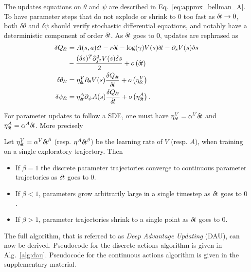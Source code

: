 The updates equations on $\theta$ and $\psi$ are described in
Eq.~\eqref{eq:approx_bellman_A}.  To have parameter steps that do not explode or shrink to $0$ too
fast as ${\delta\hspace{-.1em}t} \rightarrow 0$, both $\delta \theta$ and
$\delta \psi$ should verify stochastic differential equations, and notably
have a deterministic component of order ${\delta\hspace{-.1em}t}$. As ${\delta\hspace{-.1em}t}$ goes to $0$,
updates are rephrased as
\begin{align}
	\delta Q_{\delta\hspace{-.1em}t} &= A(s, a){\delta\hspace{-.1em}t} - r{\delta\hspace{-.1em}t} - \log(\gamma) V(s){\delta\hspace{-.1em}t} - \partial_s V(s) \delta s\nonumber \\&- \frac{(\delta s)^T \partial_{s^2}^2 V(s) \delta s}{2} + o\left({\delta\hspace{-.1em}t}\right)\\
	\delta \theta_{\delta\hspace{-.1em}t} &= \eta^V_{\delta\hspace{-.1em}t} \partial_{\theta} V(s) \frac{\delta Q_{\delta\hspace{-.1em}t}}{{\delta\hspace{-.1em}t}} + o\left(\eta^V_{\delta\hspace{-.1em}t}\right)\\
	\delta \psi_{\delta\hspace{-.1em}t} &= \eta^A_{\delta\hspace{-.1em}t} \partial_{\psi} A(s) \frac{\delta Q_{\delta\hspace{-.1em}t}}{{\delta\hspace{-.1em}t}} + o\left(\eta^A_{\delta\hspace{-.1em}t}\right).
\end{align}


For parameter updates to follow a SDE, one must
have $\eta^V_{\delta\hspace{-.1em}t} = \alpha^V {\delta\hspace{-.1em}t}$ and $\eta^A_{\delta\hspace{-.1em}t} = \alpha^A
{\delta\hspace{-.1em}t}$. More precisely
\begin{theorem}
	Let $\eta^V_{\delta\hspace{-.1em}t} = \alpha^V {\delta\hspace{-.1em}t}^\beta$ (resp. $\eta^A {\delta\hspace{-.1em}t}^\beta$) be the learning rate
	of $V$ (resp. $A$), when training on a single exploratory trajectory. Then
	\begin{itemize}
		\item If $\beta = 1$ the discrete parameter trajectories converge to continuous parameter
			trajectories as ${\delta\hspace{-.1em}t}$ goes to $0$.
		\item If $\beta < 1$, parameters grow arbitrarily large in a single timestep as ${\delta\hspace{-.1em}t}$
			goes to $0$.
		\item If $\beta > 1$, parameter trajectories shrink to a single point as 
			${\delta\hspace{-.1em}t}$ goes to $0$. 
	\end{itemize}
	\label{th:cont-params}
\end{theorem}

The full algorithm, that is referred to as \emph{Deep Advantage Updating} (DAU), can now be derived.
Pseudocode for the discrete actions algorithm is given in Alg.~\ref{alg:dau}.
Pseudocode for the continuous actions algorithm is given in the supplementary
material.

